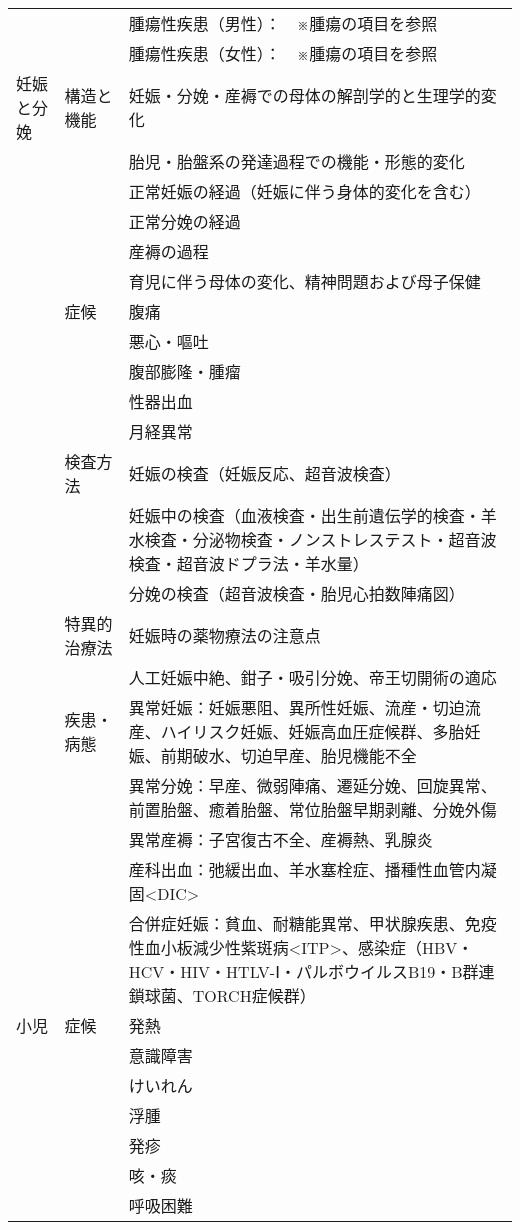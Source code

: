 \begin{xltabular}{\linewidth}{XXX}
 &  & 腫瘍性疾患（男性）：　※腫瘍の項目を参照 \\
 &  & 腫瘍性疾患（女性）：　※腫瘍の項目を参照 \\
妊娠と分娩 & 構造と機能 & 妊娠・分娩・産褥での母体の解剖学的と生理学的変化 \\
 &  & 胎児・胎盤系の発達過程での機能・形態的変化 \\
 &  & 正常妊娠の経過（妊娠に伴う身体的変化を含む） \\
 &  & 正常分娩の経過 \\
 &  & 産褥の過程 \\
 &  & 育児に伴う母体の変化、精神問題および母子保健 \\
 & 症候 & 腹痛 \\
 &  & 悪心・嘔吐 \\
 &  & 腹部膨隆・腫瘤 \\
 &  & 性器出血 \\
 &  & 月経異常 \\
 & 検査方法 & 妊娠の検査（妊娠反応、超音波検査） \\
 &  & 妊娠中の検査（血液検査・出生前遺伝学的検査・羊水検査・分泌物検査・ノンストレステスト・超音波検査・超音波ドプラ法・羊水量） \\
 &  & 分娩の検査（超音波検査・胎児心拍数陣痛図） \\
 & 特異的治療法 & 妊娠時の薬物療法の注意点 \\
 &  & 人工妊娠中絶、鉗子・吸引分娩、帝王切開術の適応 \\
 & 疾患・病態 & 異常妊娠：妊娠悪阻、異所性妊娠、流産・切迫流産、ハイリスク妊娠、妊娠高血圧症候群、多胎妊娠、前期破水、切迫早産、胎児機能不全 \\
 &  & 異常分娩：早産、微弱陣痛、遷延分娩、回旋異常、前置胎盤、癒着胎盤、常位胎盤早期剥離、分娩外傷 \\
 &  & 異常産褥：子宮復古不全、産褥熱、乳腺炎 \\
 &  & 産科出血：弛緩出血、羊水塞栓症、播種性血管内凝固<DIC> \\
 &  & 合併症妊娠：貧血、耐糖能異常、甲状腺疾患、免疫性血小板減少性紫斑病<ITP>、感染症（HBV・HCV・HIV・HTLV-Ⅰ・パルボウイルスB19・B群連鎖球菌、TORCH症候群） \\
小児 & 症候 & 発熱 \\
 &  & 意識障害 \\
 &  & けいれん \\
 &  & 浮腫 \\
 &  & 発疹 \\
 &  & 咳・痰 \\
 &  & 呼吸困難 \\

\end{xltabular}
